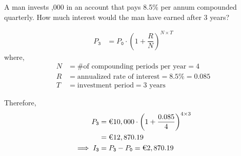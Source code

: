 

\question[2]  A man invests ,000 in an account that pays 8.5\%
per annum compounded quarterly. How much interest would the man have earned 
after 3 years? 


\ifprintanswers
\fi 

\begin{solution}[\halfpage]
	\begin{align}
		P_{\texttt{3}} &= P_{\texttt{0}}\cdot\left( 1 + \dfrac{R}{N}\right)^{N\times T}
	\end{align}
	where,
	\begin{align}
		N &= \text{\# of compounding periods per year} = 4 \\
		R &= \text{annualized rate of interest} = 8.5\% = 0.085 \\
		T &= \text{investment period} = \text{3 years}
	\end{align}
	
	Therefore,
	\begin{align}
		P_{\texttt{3}} &= \text{\texteuro}10,000\cdot\left( 1 + \dfrac{0.085}{4}\right)^{4\times 3} \\
		               &= \text{\texteuro} 12,870.19 \\
		\implies I_{\texttt{3}} &= P_{\texttt{3}} - P_{\texttt{0}} = \text{\texteuro} 2,870.19
	\end{align}
	
\end{solution}
\ifprintanswers\begin{codex}\end{codex}\fi
